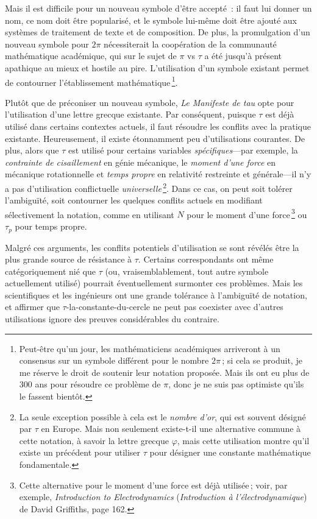 Mais il est difficile pour un nouveau symbole d'être accepté~: il faut lui donner un nom, ce nom doit être popularisé, et le symbole lui-même doit être ajouté aux systèmes de traitement de texte et de composition. De plus, la promulgation d'un nouveau symbole pour $2\pi$ nécessiterait la coopération de la communauté mathématique académique, qui sur le sujet de $\pi$ vs $\tau$ a été jusqu'à présent apathique au mieux et hostile au pire. L'utilisation d'un symbole existant permet de contourner l'établissement mathématique\,\footnote{Peut-être qu'un jour, les mathématiciens académiques arriveront à un consensus sur un symbole différent pour le nombre $2\pi$\,; si cela se produit, je me réserve le droit de soutenir leur notation proposée. Mais ils ont eu plus de 300 ans pour résoudre ce problème de $\pi$, donc je ne suis pas optimiste qu'ils le fassent bientôt.}.

Plutôt que de préconiser un nouveau symbole, \emph{Le Manifeste de tau} opte pour l'utilisation d'une lettre grecque existante. Par conséquent, puisque $\tau$ est déjà utilisé dans certains contextes actuels, il faut résoudre les conflits avec la pratique existante. Heureusement, il existe étonnamment peu d'utilisations courantes. De plus, alors que $\tau$ est utilisé pour certains variables \emph{spécifiques}---par exemple, la \emph{contrainte de cisaillement} en génie mécanique, le \emph{moment d'une force} en mécanique rotationnelle et \emph{temps propre} en relativité restreinte et générale---il n'y a pas d'utilisation conflictuelle \emph{universelle}\,\footnote{La seule exception possible à cela est le \emph{nombre d'or}, qui est souvent désigné par $\tau$ en Europe. Mais non seulement existe-t-il une alternative commune à cette notation, à savoir la lettre grecque $\varphi$, mais cette utilisation montre qu'il existe un précédent pour utiliser $\tau$ pour désigner une constante mathématique fondamentale.}. Dans ce cas, on peut soit tolérer l'ambiguïté, soit contourner les quelques conflits actuels en modifiant sélectivement la notation, comme en utilisant $N$ pour le moment d'une force\,\footnote{Cette alternative pour le moment d'une force est déjà utilisée\,; voir, par exemple, \emph{Introduction to Electrodynamics} (\emph{Introduction à l'électrodynamique}) de David Griffiths, page 162.} ou $\tau_p$ pour temps propre.

Malgré ces arguments, les conflits potentiels d'utilisation se sont révélés être la plus grande source de résistance à $\tau$. Certains correspondants ont même catégoriquement nié que $\tau$ (ou, vraisemblablement, tout autre symbole actuellement utilisé) pourrait éventuellement surmonter ces problèmes. Mais les scientifiques et les ingénieurs ont une grande tolérance à l'ambiguïté de notation, et affirmer que $\tau$-la-constante-du-cercle ne peut pas coexister avec d'autres utilisations ignore des preuves considérables du contraire.

